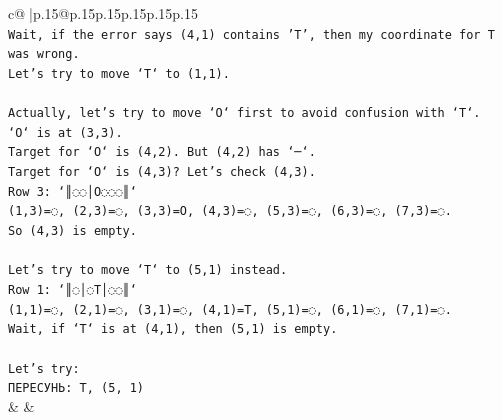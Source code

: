 \documentclass{article}
\begin{document}
{\begin{supertabular}{c@{$\;$}|p{.15\linewidth}@{}p{.15\linewidth}p{.15\linewidth}p{.15\linewidth}p{.15\linewidth}p{.15\linewidth}}
{{{\\ 
\texttt{Wait, if the error says (4,1) contains 'T', then my coordinate for T was wrong.} \\
\texttt{Let's try to move `T` to (1,1).} \\
\\ 
\texttt{Actually, let's try to move `O` first to avoid confusion with `T`.} \\
\texttt{`O` is at (3,3).} \\
\texttt{Target for `O` is (4,2). But (4,2) has `─`.} \\
\texttt{Target for `O` is (4,3)? Let's check (4,3).} \\
\texttt{Row 3: `║◌◌│O◌◌◌║`} \\
\texttt{(1,3)=◌, (2,3)=◌, (3,3)=O, (4,3)=◌, (5,3)=◌, (6,3)=◌, (7,3)=◌.} \\
\texttt{So (4,3) is empty.} \\
\\ 
\texttt{Let's try to move `T` to (5,1) instead.} \\
\texttt{Row 1: `║◌│◌T│◌◌║`} \\
\texttt{(1,1)=◌, (2,1)=◌, (3,1)=◌, (4,1)=T, (5,1)=◌, (6,1)=◌, (7,1)=◌.} \\
\texttt{Wait, if `T` is at (4,1), then (5,1) is empty.} \\
\\ 
\texttt{Let's try:} \\
\texttt{ПЕРЕСУНЬ: T, (5, 1)} \\
            }
        }
    }
    & & \\ \\


\end{supertabular}}
\end{document}
